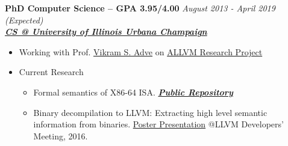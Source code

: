 \documentclass[9pt]{article}
\newenvironment{changemargin}[2]{%
  \begin{list}{}{%
    \setlength{\topsep}{0pt}%
    \setlength{\leftmargin}{#1}%
    \setlength{\rightmargin}{#2}%
    \setlength{\listparindent}{\parindent}%
    \setlength{\itemindent}{\parindent}%
    \setlength{\parsep}{\parskip}%
  }%
  \item[]}{\end{list}
}
\newenvironment{body} {
	\vspace*{-16pt}
	\begin{changemargin}{-0.25in}{-0.5in}
  }	
	{\end{changemargin}
}
\begin{document}
\begin{body}
	\vspace{14pt}

        \textbf{PhD Computer Science -- GPA 3.95/4.00}{} \hfill \emph{August 2013 - April 2019 (Expected)}{} \\
	\textbf{\emph{\href{http://cs.illinois.edu/}{CS @ University of Illinois Urbana Champaign}}{}} \\
	\begin{itemize} \itemsep -0pt
            \item  Working with Prof.
              \href{http://vikram.cs.illinois.edu/}{Vikram S.
              Adve} on \href{https://publish.illinois.edu/allvm-project/}{ALLVM
              Research Project}
          \item  Current Research 
            \begin{itemize} 
              \item Formal semantics of X86-64 ISA. \textbf{\emph{{\href{https://github.com/kframework/X86-64-semantics}{Public Repository}}}}
              \item Binary decompilation to LLVM: Extracting high level semantic information from binaries.
                \href{https://www.dropbox.com/s/8s20r8pi3eu4knw/allin_poster.pdf?dl=0}{Poster Presentation} @LLVM Developers' Meeting, 2016.
            \end{itemize} 
        \end{itemize}

 \medskip


\end{body}
\end{document}
